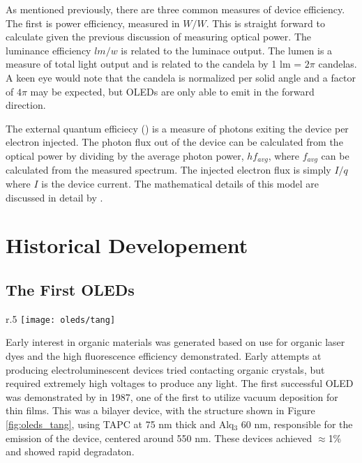 \documentclass[../thesis.tex]{subfiles}
\begin{document}
As mentioned previously, there are three common measures of device efficiency.  
The first is power efficiency, measured in $W/W$.
This is straight forward to calculate given the previous discussion of measuring optical power.
The luminance efficiency $lm/w$ is related to the luminace output.
The lumen is a measure of total light output and is related to the candela by 1 lm = $2\pi$ candelas.
A keen eye would note that the candela is normalized per solid angle and a factor of $4\pi$ may be expected, but OLEDs are only able to emit in the forward direction.

The external quantum efficiecy (\eqe) is a measure of photons exiting the device per electron injected.
The photon flux out of the device can be calculated from the optical power by dividing by the average photon power, $hf_{avg}$, where $f_{avg}$ can be calculated from the measured spectrum.
The injected electron flux is simply $I/q$ where $I$ is the device current.
The mathematical details of this model are discussed in detail by \textcite{Forrest2003}.%


\section{Historical Developement}\label{sec:oled_history}
\subsection{The First OLEDs}

\begin{wrapfigure}{r}{.5\textwidth}
\texttt{[image: oleds/tang]}
\caption{Structure of the first oled cell from \textcite{Tang1987}.  Diamine is commonly referred to now as TAPC.}
\label{fig:oleds_tang}
\end{wrapfigure}

Early interest in organic materials was generated based on use for organic laser dyes and the high fluorescence efficiency demonstrated.\supercite{Venkataraman1971,Schafer1977,Dresner1969}
Early attempts at producing electroluminescent devices tried contacting organic crystals, but required extremely high voltages to produce any light.\supercite{Williams1970,Helfrich1965}
The first successful OLED was demonstrated by \textcite{Tang1987} in 1987, one of the first to utilize vacuum deposition for thin films.
This was a bilayer device, with the structure shown in Figure \ref{fig:oleds_tang}, using TAPC at 75 nm thick and Alq$_3$ 60 nm, responsible for the emission of the device, centered around 550 nm.
These devices achieved \eqe $\approx$1\% and showed rapid degradaton.
\end{document}
